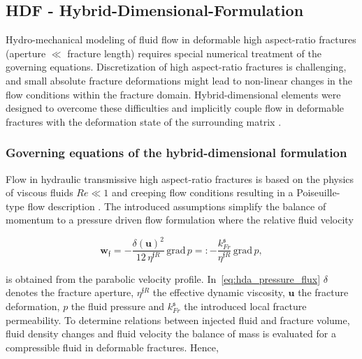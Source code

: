 \subsection{HDF - Hybrid-Dimensional-Formulation}

Hydro-mechanical modeling of fluid flow in deformable high aspect-ratio fractures (aperture $\ll$ fracture length) requires special numerical treatment of the governing equations. Discretization of high aspect-ratio fractures is challenging, and small absolute fracture deformations might lead to non-linear changes in the flow conditions within the fracture domain. Hybrid-dimensional elements were designed to overcome these difficulties and implicitly couple flow in deformable fractures with the deformation state of the surrounding matrix \cite{vinci2014, vinci2015,KIM20112094,KIM20111591,Girault2015,Girault2016,Castelletto2015,segura2004,segura2008coupledI,segura2008coupledII,vinci2014hydro,settgast2017fully,schmidt2019}.

\subsubsection*{Governing equations of the hybrid-dimensional formulation}

Flow in hydraulic transmissive high aspect-ratio fractures is based on the physics of viscous fluids $Re \ll 1$ and creeping flow conditions resulting in a Poiseuille-type flow description \cite{witherspoon1979}. The introduced assumptions simplify the balance of momentum to a pressure driven flow formulation where the relative fluid velocity

\begin{equation}
\label{eq:hda_pressure_flux}
\mathbf{w}_\mathfrak{f} = -\frac{\delta(\mathbf{u})^2}{12\,\eta^{\mathfrak{f}R}} \, \text{grad} \, p
=: -\frac{k^\mathfrak{s}_{Fr}}{\eta^{\mathfrak{f}R}} \, \text{grad} \, p,
\end{equation}

is obtained from the parabolic velocity profile. In~\eqref{eq:hda_pressure_flux} $\delta$ denotes the fracture aperture, $\eta^{\mathfrak{f}R}$ the effective dynamic viscosity, $\mathbf{u}$ the fracture deformation, $p$ the fluid pressure and $k^\mathfrak{s}_{Fr}$ the introduced local fracture permeability.
To determine relations between injected fluid and fracture volume, fluid density changes and fluid velocity the balance of mass is evaluated for a compressible fluid in deformable fractures. Hence,

